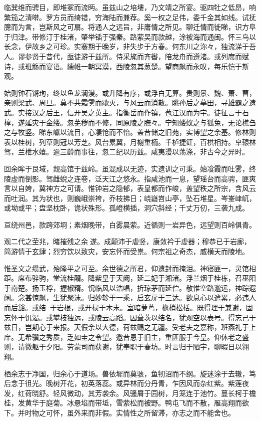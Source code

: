 \documentclass[12pt,UTF8]{ctexbook}
\begin{document}
临巽维而骋目，即堆冢而流眄。虽兹山之培塿，乃文靖之所宴。驱四牡之低昂，响繁笳之清啭。罗方员而绮错，穷海陆而兼荐。奚一权之足伟，委千金其如线。试抚臆而为言，岂斯风之可扇。将通人之远旨，非庸情之所见。聊迁情而徙睇，识方阜于归津。带修汀于桂渚，肇举锸于强秦。路萦吴而款越，涂被海而通闽。怀三鸟以长念，伊故乡之可珍。实褰期于晚岁，非失步于方春。何东川之沵々，独流涕于吾人。谬参贤于昔代，亟徒游于兹所。侍采旄而齐辔，陪龙舟而遵渚。或列席而赋诗，或班觞而宴语。繐帷一朝冥漠，西陵忽其葱楚。望商飙而永叹，每乐恺于斯观。

始则钟石锵珣，终以鱼龙澜漫。或升降有序，或浮白无算。贵则景、魏、萧、曹，亲则梁武、周旦。莫不共霜雾而歇灭，与风云而消散。眺孙后之墓田，寻雄霸之遗武。实接汉之后王，信开吴之英主。指衡岳而作镇，苞江汉而为宇。徒征言于石椁，遂延灾于金缕。忽芜秽而不修，同原陵之膴々。宁知蝼蚁之与狐兔，无论樵刍之与牧竖。睇东巘以流目，心凄怆而不怡。盖昔储之旧苑，实博望之余基。修林则表以桂树，列草则冠以芳芝。风台累翼，月榭重栭。千栌捷釭，百栱相持。皁辕林驾，兰枻水嬉。逾三龄而事往，忽二纪以历兹。咸夷漫以荡涤，非古今之异时。

回余眸于艮域，觌高馆于兹岭。虽混成以无迹，实遗训之可秉。始飡霞而吐雾，终陵虚而倒影。驾雌蜺之连卷，泛天江之悠永。指咸池而一息，望瑶台而高骋，匪爽言以自姱，冀神方之可请。惟钟岩之隐郁，表皇都而作峻，盖望秩之所宗，含风云而吐润。其为状也，则巍峨崇袴，乔枝拂日；峣嶷岧{山亭}，坠石堆星。岑崟峍屼，或坳或平；盘坚枕卧，诡状殊形。孤嶝横插，洞穴斜经；千丈万仞，三袭九成。

亘绕州邑，款跨郊坰；素烟晚带，白雾晨萦。近循则一岩异色，远望则百岭俱青。

观二代之茔兆，睹摧残之余遂。成颠沛于虐竖，康敛衿于虚器；穆恭已于岩廊，简游情于玄肆；烈穷饮以致灾，安忘怀而受祟。何宗祖之奇杰，威横天而陵地。

惟圣文之缵武，殆隆平之可至。余世德之所君，仰遗封而掩泪。神寝匪一，灵馆相距。席布骍驹，堂流桂醑。降紫皇于天阙，延二妃于湘渚。浮兰烟于桂栋，召巫阳于南楚。扬玉桴，握椒糈。怳临风以浩唱，折琼茅而延伫。敬惟空路邈远，神踪遐阔。念甚惊飙，生犹聚沫。归妙轸于一乘，启玄扉于三达。欲息心以遣累，必违人而后豁。或结于岩根，或开棂于木末。室暗萝茑，檐梢松栝。既得理于兼谢，固忘怀于饥渴。或攀枝独远，或陵云高蹈。因葺茨以结名，犹观空以表号。得忘己于兹日，岂期心于来报。天假余以大德，荷兹赐之无疆。受老夫之嘉称，班燕礼于上庠。无希骥之秀质，乏如圭之令望。邀昔恩于旧主，重匪服于今皇。仰休老之盛则，请微躯于夕阳。劳蒙司而获谢，犹奉职于春坊。时言归于陋宇，聊暇日以翱翔。

栖余志于净国，归余心于道场。兽依墀而莫骇，鱼牣沼而不纲。旋迷涂于去辙，笃后念于徂光。晚树开花，初英落蕊。或异林而分丹青，乍因风而杂红紫。紫莲夜发，红荷晓舒。轻风微动，其芳袭余。风骚屑于园树，月笼连于池竹。蔓长柯于檐桂，发黄华于庭菊。冰悬埳而带坻，雪萦松而被野。鸭屯飞而不散，雁高翔而欲下。并时物之可怀，虽外来而非假。实情性之所留滞，亦志之而不能舍也。
\end{document}
